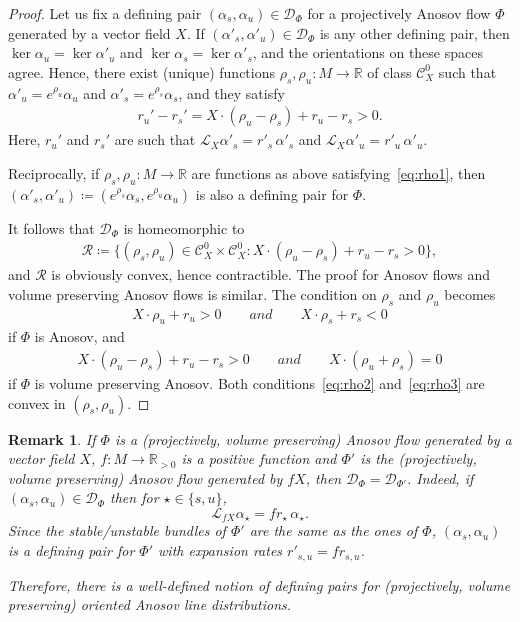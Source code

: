 \documentclass[letterpaper, 11pt]{article}
\numberwithin{equation}{section}
\newtheorem{rem}[thm]{Remark}
\newcommand{\R}{\mathbb{R}}
\begin{document}
 \begin{proof}
Let us fix a defining pair $(\alpha_s, \alpha_u) \in \mathcal{D}_\Phi$ for a projectively Anosov flow $\Phi$ generated by a vector field $X$. If $(\alpha'_s, \alpha'_u) \in \mathcal{D}_\Phi$ is any other defining pair, then $\ker \alpha_u = \ker \alpha'_u$ and $\ker \alpha_s = \ker \alpha'_s$, and the orientations on these spaces agree. Hence, there exist (unique) functions $\rho_s, \rho_u : M \rightarrow \R$ of class $\mathcal{C}^0_X$ such that $\alpha'_u = e^{\rho_u} \alpha_u$ and $\alpha'_s = e^{\rho_s} \alpha_s$, and they satisfy
\begin{align} \label{eq:rho1}
r_u' - r_s' = X \cdot (\rho_u - \rho_s) + r_u - r_s > 0.
\end{align}
Here, $r_u'$ and $r_s'$ are such that $\mathcal{L}_X \alpha'_s = r'_s \, \alpha'_s$ and $\mathcal{L}_X \alpha'_u = r'_u \, \alpha'_u$.

Reciprocally, if $\rho_s, \rho_u : M \rightarrow \R$ are functions as above satisfying~\eqref{eq:rho1}, then $(\alpha'_s, \alpha'_u) \coloneqq (e^{\rho_s} \alpha_s, e^{\rho_u} \alpha_u)$ is also a defining pair for $\Phi$.

It follows that $\mathcal{D}_\Phi$ is homeomorphic to 
\begin{align*}
\mathcal{R} \coloneqq \big\{ (\rho_s, \rho_u) \in \mathcal{C}^0_X \times \mathcal{C}^0_X : X \cdot (\rho_u - \rho_s) + r_u - r_s > 0 \big\},
\end{align*}
and $\mathcal{R}$ is obviously convex, hence contractible. The proof for Anosov flows and volume preserving Anosov flows is similar. The condition on $\rho_s$ and $\rho_u$ becomes
\begin{align} \label{eq:rho2}
X \cdot \rho_u + r_u > 0 \qquad and \qquad X \cdot \rho_s + r_s < 0
\end{align}
if $\Phi$ is Anosov, and
\begin{align} \label{eq:rho3}
X \cdot (\rho_u - \rho_s) + r_u - r_s > 0  \qquad and \qquad X \cdot (\rho_u + \rho_s) = 0
\end{align}
if $\Phi$ is volume preserving Anosov. Both conditions~\eqref{eq:rho2} and~\eqref{eq:rho3} are convex in $(\rho_s, \rho_u)$.
\end{proof}

\begin{rem} If $\Phi$ is a (projectively, volume preserving) Anosov flow generated by a vector field $X$, $f : M \rightarrow \R_{>0}$ is a positive function and $\Phi'$ is the (projectively, volume preserving) Anosov flow generated by $fX$, then $\mathcal{D}_\Phi = \mathcal{D}_{\Phi'}$. Indeed, if $(\alpha_s, \alpha_u) \in \mathcal{D}_\Phi$ then for $\star \in \{s,u\}$,
$$\mathcal{L}_{fX} \alpha_\star = f r_\star \, \alpha_\star.$$
Since the stable/unstable bundles of $\Phi'$ are the same as the ones of $\Phi$, $(\alpha_s, \alpha_u)$ is a defining pair for $\Phi'$ with expansion rates $r'_{s,u} = f r_{s,u}$.

Therefore, there is a well-defined notion of defining pairs for (projectively, volume preserving) oriented Anosov \emph{line distributions}.
\end{rem}
\end{document}
